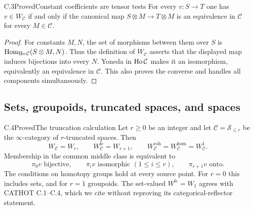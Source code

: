 \begin{claim}{C.3}{Proved}{Constant coefficients are tensor tests}
For every $v:S\to T$ one has $v\in W_{\mathcal C}$ if and only if the canonical map $S\otimes M\to T\otimes M$ is an equivalence in $\mathcal C$ for every $M\in\mathcal C$.
\end{claim}
\begin{proof}
For constants $M,N$, the set of morphisms between them over $S$ is $\operatorname{Hom}_{\operatorname{Ho}\mathcal C}(S\otimes M,N)$.  Thus the definition of $W_{\mathcal C}$ asserts that the displayed map induces bijections into every $N$.  Yoneda in $\operatorname{Ho}\mathcal C$ makes it an isomorphism, equivalently an equivalence in $\mathcal C$.  This also proves the converse and handles all components simultaneously.
\end{proof}

\subsection{Sets, groupoids, truncated spaces, and spaces}
\begin{claim}{C.4}{Proved}{The truncation calculation}
Let $r\geq0$ be an integer and let $\mathcal C=\mathcal S_{\leq r}$ be the $\infty$-category of $r$-truncated spaces.  Then
\[
 W_{\mathcal C}=W_r,\qquad W_{\mathcal C}^{\mathrm{lc}}=W_{r+1},\qquad
 W_{\mathcal C}^{\mathrm{coh}}=W_{\mathcal C}^{\mathrm{hom}}=W_{\mathcal C}^{1}.
\]
Membership in the common middle class is equivalent to
\[
 \pi_0v\text{ bijective},\qquad
 \pi_iv\text{ isomorphic }(1\leq i\leq r),\qquad
 \pi_{r+1}v\text{ onto}.
\]
The conditions on homotopy groups hold at every source point.  For $r=0$ this includes sets, and for $r=1$ groupoids.  The set-valued $W^{\mathrm{lc}}=W_1$ agrees with CATHOT C.1--C.4, which we cite without reproving its categorical-reflector statement.
\end{claim}
